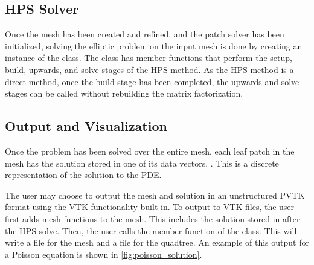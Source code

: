 \subsection{HPS Solver}

Once the mesh has been created and refined, and the patch solver has been initialized, solving the elliptic problem on the input mesh is done by creating an instance of the  class. The  class has member functions that perform the setup, build, upwards, and solve stages of the HPS method. As the HPS method is a direct method, once the build stage has been completed, the upwards and solve stages can be called without rebuilding the matrix factorization.

\subsection{Output and Visualization}

Once the problem has been solved over the entire mesh, each leaf patch in the mesh has the solution stored in one of its data vectors, . This is a discrete representation of the solution to the PDE.

The user may choose to output the mesh and solution in an unstructured PVTK format using the VTK functionality built-in. To output to VTK files, the user first adds mesh functions to the mesh. This includes the solution stored in  after the HPS solve. Then, the user calls the  member function of the  class. This will write a  file for the mesh and a  file for the quadtree. An example of this output for a Poisson equation is shown in \autoref{fig:poisson_solution}.

